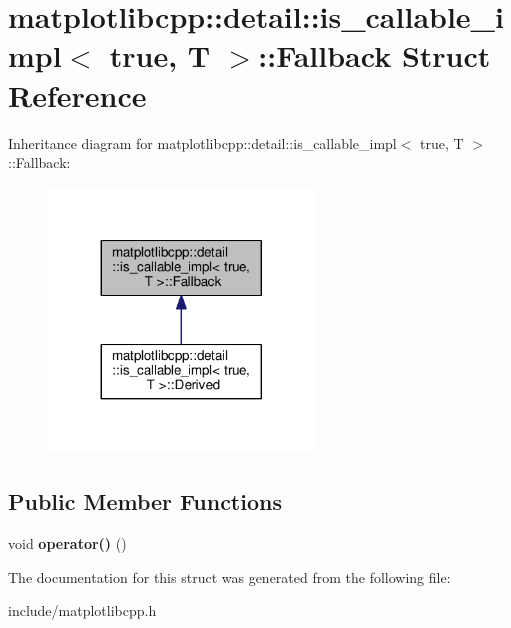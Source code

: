 \hypertarget{structmatplotlibcpp_1_1detail_1_1is__callable__impl_3_01true_00_01T_01_4_1_1Fallback}{}\section{matplotlibcpp\+:\+:detail\+:\+:is\+\_\+callable\+\_\+impl$<$ true, T $>$\+:\+:Fallback Struct Reference}
\label{structmatplotlibcpp_1_1detail_1_1is__callable__impl_3_01true_00_01T_01_4_1_1Fallback}


Inheritance diagram for matplotlibcpp\+:\+:detail\+:\+:is\+\_\+callable\+\_\+impl$<$ true, T $>$\+:\+:Fallback\+:
\nopagebreak
\begin{figure}[H]
\begin{center}
\leavevmode
\includegraphics[width=200pt]{structmatplotlibcpp_1_1detail_1_1is__callable__impl_3_01true_00_01T_01_4_1_1Fallback__inherit__graph}
\end{center}
\end{figure}
\subsection*{Public Member Functions}
\begin{DoxyCompactItemize}
\item 
void {\bfseries operator()} ()\hypertarget{structmatplotlibcpp_1_1detail_1_1is__callable__impl_3_01true_00_01T_01_4_1_1Fallback_ad72a88facc127249a3a171a462a7a95e}{}\label{structmatplotlibcpp_1_1detail_1_1is__callable__impl_3_01true_00_01T_01_4_1_1Fallback_ad72a88facc127249a3a171a462a7a95e}

\end{DoxyCompactItemize}


The documentation for this struct was generated from the following file\+:\begin{DoxyCompactItemize}
\item 
include/matplotlibcpp.\+h\end{DoxyCompactItemize}
